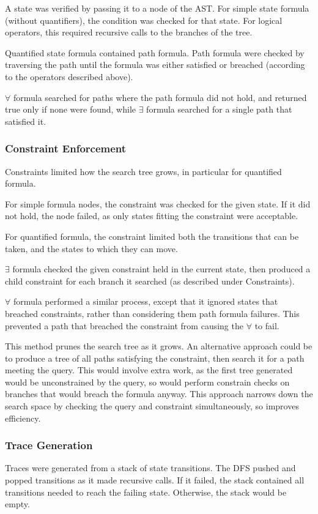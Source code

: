 \documentclass[a4paper,11pt]{article}
\begin{document}
	A state was verified by passing it to a node of the AST. For simple state formula (without quantifiers), the condition was checked for that state. For logical operators, this required recursive calls to the branches of the tree.
	
	Quantified state formula contained path formula. Path formula were checked by traversing the path until the formula was either satisfied or breached (according to the operators described above).
	
	$\forall$ formula searched for paths where the path formula did not hold, and returned true only if none were found, while $\exists$ formula searched for a single path that satisfied it.
	
	\subsubsection{Constraint Enforcement}
	Constraints limited how the search tree grows, in particular for quantified formula. 
	
	For simple formula nodes, the constraint was checked for the given state. If it did not hold, the node failed, as only states fitting the constraint were acceptable.
	
	For quantified formula, the constraint limited both the transitions that can be taken, and the states to which they can move. 
	
	$\exists$ formula checked the given constraint held in the current state, then produced a child constraint for each branch it searched (as described under Constraints).
	
	$\forall$ formula performed a similar process, except that it ignored states that breached constraints, rather than considering them path formula failures. This prevented a path that breached the constraint from causing the $\forall$ to fail.
	
	This method prunes the search tree as it grows. An alternative approach could be to produce a tree of all paths satisfying the constraint, then search it for a path meeting the query. This would involve extra work, as the first tree generated would be unconstrained by the query, so would perform constrain checks on branches that would breach the formula anyway. This approach narrows down the search space by checking the query and constraint simultaneously, so improves efficiency.
	
	\subsubsection{Trace Generation}
	Traces were generated from a stack of state transitions. The DFS pushed and popped transitions as it made recursive calls. If it failed, the stack contained all transitions needed to reach the failing state. Otherwise, the stack would be empty.
	
\end{document}
